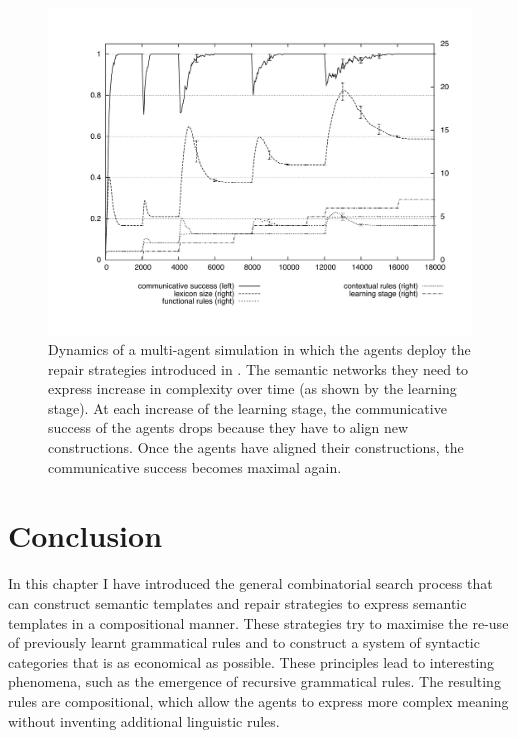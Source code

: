 \begin{figure}
  \begin{center}
    \includegraphics[width=.8\textwidth]{./composition/figures/learning-operators-graph.pdf}
    \caption[Resulting dynamics of repair strategies for predefined
    conceptualisations]{Dynamics of a multi-agent simulation in which
      the agents deploy the repair strategies introduced in . The semantic networks they
      need to express increase in complexity over time (as shown by
      the learning stage). At each increase of the learning stage, the
      communicative success of the agents drops because they have to
      align new constructions. Once the agents have aligned their
      constructions, the communicative success becomes maximal again.}
    \label{f:map-repair-strategies-graph}
  \end{center}
\end{figure}

\section{Conclusion}

In this chapter I have introduced the general combinatorial search
process that can construct semantic templates and repair strategies to
express semantic templates in a compositional manner. These strategies
try to maximise the re-use of previously learnt grammatical rules and
to construct a system of syntactic categories that is as economical as
possible. These principles lead to interesting phenomena, such as the
emergence of recursive grammatical rules. The resulting rules are
compositional, which allow the agents to express more complex meaning
without inventing additional linguistic rules.

\newpage
\thispagestyle{empty}